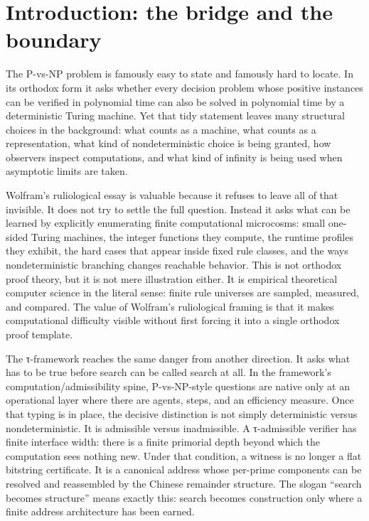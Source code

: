 \documentclass{pantarhei-researchnote}
\newcommand{\Wolfram}{Wolfram}
\begin{document}
\section{Introduction: the bridge and the boundary}
\label{sec:intro}

The P-vs-NP problem is famously easy to state and famously hard to locate.
In its orthodox form it asks whether every decision problem whose positive
instances can be verified in polynomial time can also be solved in
polynomial time by a deterministic Turing machine. Yet that tidy statement
leaves many structural choices in the background: what counts as a
machine, what counts as a representation, what kind of nondeterministic
choice is being granted, how observers inspect computations, and what
kind of infinity is being used when asymptotic limits are taken.

\Wolfram's ruliological essay is valuable because it refuses to leave all
of that invisible. It does not try to settle the full question. Instead it
asks what can be learned by explicitly enumerating finite computational
microcosms: small one-sided Turing machines, the integer functions they
compute, the runtime profiles they exhibit, the hard cases that appear
inside fixed rule classes, and the ways nondeterministic branching changes
reachable behavior. This is not orthodox proof theory, but it is not mere
illustration either. It is empirical theoretical computer science in the
literal sense: finite rule universes are sampled, measured, and compared.
The value of Wolfram's ruliological framing is that it makes
computational difficulty visible without first forcing it into a single
orthodox proof template.

The τ-framework reaches the same danger from another direction. It asks
what has to be true before search can be called search at all. In the
framework's computation/admissibility spine, P-vs-NP-style questions are
native only at an operational layer where there are agents, steps, and an
efficiency measure. Once that typing is in place, the decisive distinction
is not simply deterministic versus nondeterministic. It is admissible
versus inadmissible. A τ-admissible verifier has finite interface width:
there is a finite primorial depth beyond which the computation sees
nothing new. Under that condition, a witness is no longer a flat bitstring
certificate. It is a canonical address whose per-prime components can be
resolved and reassembled by the Chinese remainder structure. The slogan
``search becomes structure'' means exactly this: search becomes
construction only where a finite address architecture has been earned.
\end{document}
